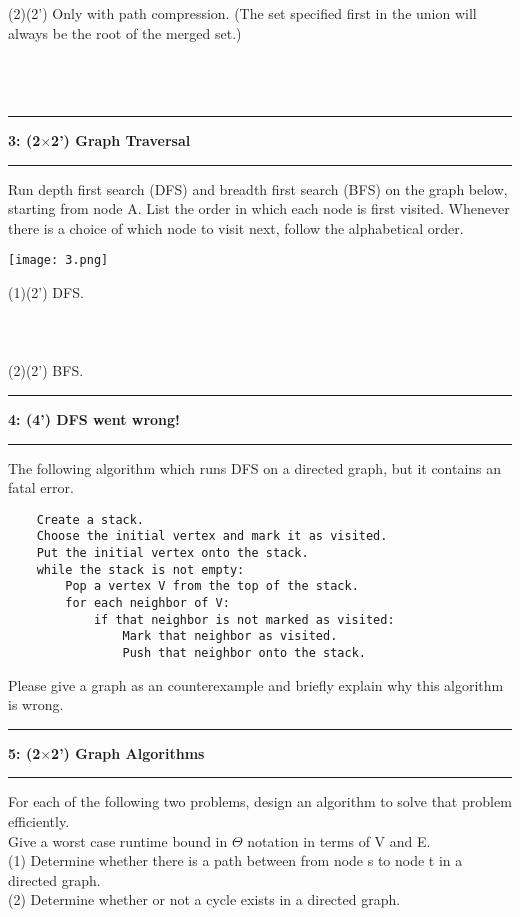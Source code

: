 \documentclass[10.5pt]{article}
\newcommand\question[2]{\vspace{.25in}\hrule\textbf{#1: #2}\vspace{.5em}\hrule\vspace{.10in}}
\begin{document}
(2)(2') Only with path compression. (The set specified first in the union will always be
the root of the merged set.)\\
\\\\\\

\pagebreak

\question{3}{(2$\times$2') Graph Traversal}

Run depth first search (DFS) and breadth first search (BFS) on the graph below, starting from node A. List the order in which each node is first visited. Whenever there is a choice of which node to visit next, follow the alphabetical order.

\begin{center}\texttt{[image: 3.png]}
\end{center}

(1)(2') DFS.\\
\vspace{3cm}
\\
\\
\\

(2)(2') BFS.

\pagebreak
\question{4}{(4') DFS went wrong!}
The following algorithm which runs DFS on a directed graph, but it contains an fatal error.
\begin{lstlisting}
    Create a stack.
    Choose the initial vertex and mark it as visited.
    Put the initial vertex onto the stack.
    while the stack is not empty:
        Pop a vertex V from the top of the stack.
        for each neighbor of V:
            if that neighbor is not marked as visited:
                Mark that neighbor as visited.
                Push that neighbor onto the stack.
\end{lstlisting}

Please give a graph as an counterexample and briefly explain why this algorithm is wrong. 
\\



\pagebreak

\question{5}{(2$\times$2') Graph Algorithms}
For each of the following two problems, design an algorithm to solve that problem efficiently.\\
Give a worst case runtime bound in $\Theta$ notation in terms of V and E.
\\
(1) Determine whether there is a path between from node s to node t in a directed graph.\\

\vspace{9cm}
(2) Determine whether or not a cycle exists in a directed graph.
	
\end{document}
